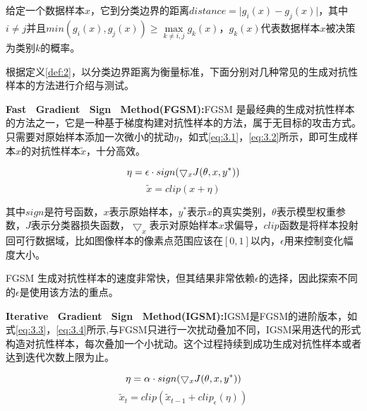 \begin{Definition}[分类边界距离]
	\label{def:2}
	给定一个数据样本$x$，它到分类边界的距离$distance = \vert g_i(x) - g_j(x) \vert$，其中$i \neq j $并且$min(g_i(x), g_j(x)) \geq \mathop{max} \limits_{k \neq i, j}g_k(x)$，$g_k(x)$代表数据样本$x$被决策为类别$k$的概率。
\end{Definition}

根据定义\ref{def:2}，以分类边界距离为衡量标准，下面分别对几种常见的生成对抗性样本的方法进行介绍与测试。


\noindent\textbf{Fast \ Gradient \ Sign \ Method(FGSM):}FGSM \cite{goodfellow2014explaining}是最经典的生成对抗性样本的方法之一，它是一种基于梯度构建对抗性样本的方法，属于无目标的攻击方式。只需要对原始样本添加一次微小的扰动$\eta$，如式\ref{eq:3.1}，\ref{eq:3.2}所示，即可生成样本$x$的对抗性样本$\tilde{x}$，十分高效。

\begin{equation}
	\setlength\abovedisplayshortskip{-5mm}
	\label{eq:3.1}
	\eta = \epsilon \cdot sign(\bigtriangledown_xJ(\theta,x,y^*))
\end{equation}
\begin{equation}
	\label{eq:3.2}
	\tilde{x} = clip(x + \eta)
\end{equation}

其中$sign$是符号函数，$x$表示原始样本，$y^*$表示$x$的真实类别，$\theta$表示模型权重参数，$J$表示分类器损失函数，$\bigtriangledown_x$表示对原始样本$x$求偏导，$clip$函数是将样本投射回可行数据域，比如图像样本的像素点范围应该在$[0,1]$以内，$\epsilon$用来控制变化幅度大小。

FGSM 生成对抗性样本的速度非常快，但其结果非常依赖$\epsilon$的选择，因此探索不同的$\epsilon$是使用该方法的重点。

\noindent\textbf{Iterative \ Gradient \ Sign \ Method(IGSM):}IGSM\cite{kurakin2018adversarial}是FGSM的进阶版本，如式\ref{eq:3.3}，\ref{eq:3.4}所示,与FGSM只进行一次扰动叠加不同，IGSM采用迭代的形式构造对抗性样本，每次叠加一个小扰动。这个过程持续到成功生成对抗性样本或者达到迭代次数上限为止。

\begin{equation}
	\setlength\abovedisplayshortskip{-5mm}
	\label{eq:3.3}
	\eta = \alpha \cdot sign(\bigtriangledown_xJ(\theta,x,y^*))
\end{equation}
\begin{equation}
	\label{eq:3.4}
	\tilde{x}_t = clip(\tilde{x}_{t - 1}  + clip_{\epsilon}(\eta))
\end{equation}

